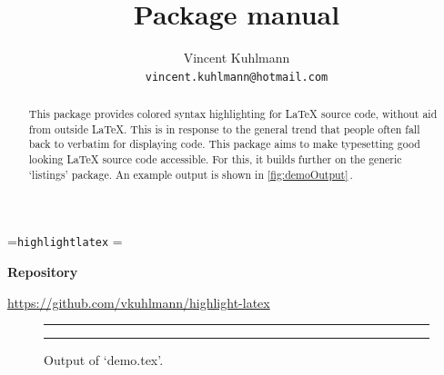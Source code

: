 \documentclass{ltxdoc}
\let\hll\lstinline
\begin{document}
\newbox\cmdintitle
\setbox\cmdintitle=\hbox{\hll|highlightlatex|}
\setbox\cmdintitle=\hbox{}
\def\defaultgobble{8}

\title{Package \usebox\cmdintitle{} manual}
\author{
	Vincent Kuhlmann\\
	\texttt{vincent.kuhlmann@hotmail.com}
}


\maketitle
\begin{abstract}
	This package provides colored syntax highlighting for \LaTeX{} source code, without aid from
	outside \LaTeX. This is in response to the general trend that people often fall back to verbatim
	for displaying code. This package aims to make typesetting good looking \LaTeX{} source code accessible.
	For this, it builds further on the generic `listings' package. An example output is
	shown in \autoref{fig:demoOutput}\,.
\end{abstract}

\bigskip

\begin{center}
	{\small\textbf{Repository}}

	\url{https://github.com/vkuhlmann/highlight-latex}
\end{center}

\vspace{5\baselineskip}

\begin{figure}[htbp]
	\centering
	\rule{2cm}{1pt}

	\bigskip
	\caption{Output of `demo.tex'.}\label{fig:demoOutput}
	\bigskip
	\rule{2cm}{1pt}
\end{figure}
\end{document}
